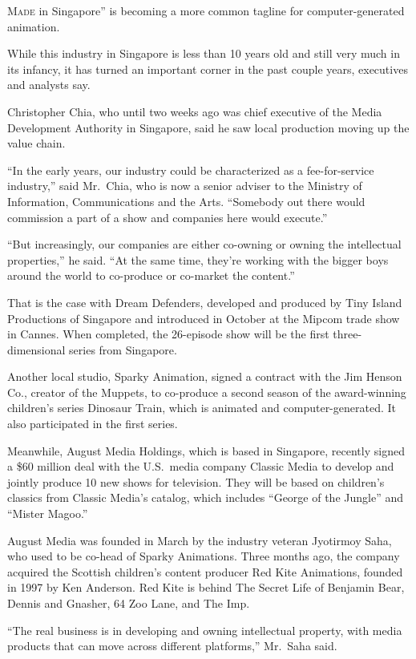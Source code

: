 ﻿\documentclass[12pt]{article}
\begin{document}
\lettrine{M}{ade} in Singapore'' is becoming a more common tagline for
computer-generated animation.

While this industry in Singapore is less than 10 years old and still very much in its infancy, it
has turned an important corner in the past couple years, executives and analysts say.

Christopher Chia, who until two weeks ago was chief executive of the Media Development Authority in
Singapore, said he saw local production moving up the value chain.

``In the early years, our industry could be characterized as a fee-for-service industry,'' said
Mr.~Chia, who is now a senior adviser to the Ministry of Information, Communications and the Arts.
``Somebody out there would commission a part of a show and companies here would execute.''

``But increasingly, our companies are either co-owning or owning the intellectual properties,'' he
said. ``At the same time, they're working with the bigger boys around the world to co-produce or
co-market the content.''

That is the case with Dream Defenders, developed and produced by Tiny Island Productions of
Singapore and introduced in October at the Mipcom trade show in Cannes. When completed, the
26-episode show will be the first three-dimensional series from Singapore.

Another local studio, Sparky Animation, signed a contract with the Jim Henson Co., creator of the
Muppets, to co-produce a second season of the award-winning children's series Dinosaur Train, which
is animated and computer-generated. It also participated in the first series.

Meanwhile, August Media Holdings, which is based in Singapore, recently signed a \$60 million deal
with the U.S.~media company Classic Media to develop and jointly produce 10 new shows for
television. They will be based on children's classics from Classic Media's catalog, which includes
``George of the Jungle'' and ``Mister Magoo.''

August Media was founded in March by the industry veteran Jyotirmoy Saha, who used to be co-head of
Sparky Animations. Three months ago, the company acquired the Scottish children's content producer
Red Kite Animations, founded in 1997 by Ken Anderson. Red Kite is behind The Secret Life of Benjamin
Bear, Dennis and Gnasher, 64 Zoo Lane, and The Imp.

``The real business is in developing and owning intellectual property, with media products that can
move across different platforms,'' Mr.~Saha said.
\end{document}

